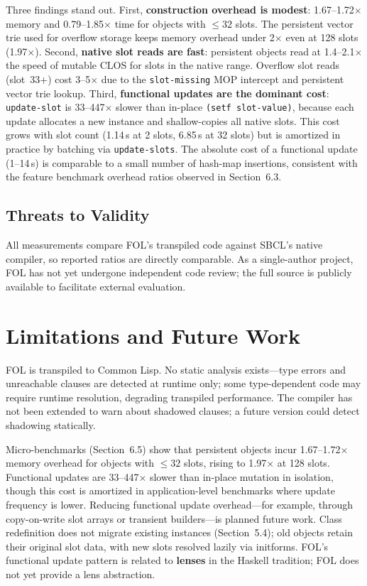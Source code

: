 \documentclass[sigconf,nonacm,review]{acmart}
\begin{document}
Three findings stand out. First, \textbf{construction overhead is modest}: 1.67--1.72$\times$ memory and 0.79--1.85$\times$ time for objects with $\le 32$ slots. The persistent vector trie used for overflow storage keeps memory overhead under 2$\times$ even at 128 slots (1.97$\times$). Second, \textbf{native slot reads are fast}: persistent objects read at 1.4--2.1$\times$ the speed of mutable CLOS for slots in the native range. Overflow slot reads (slot~33+) cost 3--5$\times$ due to the \texttt{slot-missing} MOP intercept and persistent vector trie lookup. Third, \textbf{functional updates are the dominant cost}: \texttt{update-slot} is 33--447$\times$ slower than in-place \texttt{(setf slot-value)}, because each update allocates a new instance and shallow-copies all native slots. This cost grows with slot count (1.14\,\textmu s at 2 slots, 6.85\,\textmu s at 32 slots) but is amortized in practice by batching via \texttt{update-slots}. The absolute cost of a functional update (1--14\,\textmu s) is comparable to a small number of hash-map insertions, consistent with the feature benchmark overhead ratios observed in Section~6.3.

\subsection{Threats to Validity}

All measurements compare FOL's transpiled code against SBCL's native compiler, so reported ratios are directly comparable. As a single-author project, FOL has not yet undergone independent code review; the full source is publicly available to facilitate external evaluation.

\section{Limitations and Future Work}

FOL is transpiled to Common Lisp. No static analysis exists---type errors and unreachable clauses are detected at runtime only; some type-dependent code may require runtime resolution, degrading transpiled performance. The compiler has not been extended to warn about shadowed clauses; a future version could detect shadowing statically.

Micro-benchmarks (Section~6.5) show that persistent objects incur 1.67--1.72$\times$ memory overhead for objects with $\le 32$ slots, rising to 1.97$\times$ at 128 slots. Functional updates are 33--447$\times$ slower than in-place mutation in isolation, though this cost is amortized in application-level benchmarks where update frequency is lower. Reducing functional update overhead---for example, through copy-on-write slot arrays or transient builders---is planned future work. Class redefinition does not migrate existing instances (Section~5.4); old objects retain their original slot data, with new slots resolved lazily via initforms. FOL's functional update pattern is related to \textbf{lenses} in the Haskell tradition; FOL does not yet provide a lens abstraction.
\end{document}
